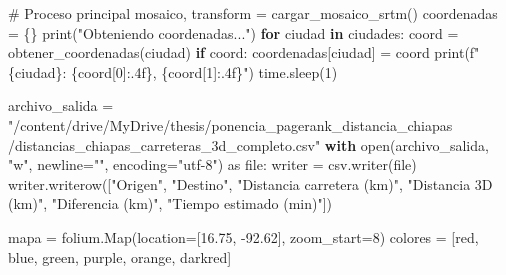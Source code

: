 \documentclass[
  letterpaper,
  DIV=11,
  numbers=noendperiod]{scrreprt}
\newenvironment{Shaded}{\begin{snugshade}}{\end{snugshade}}
\newcommand{\BuiltInTok}[1]{\textcolor[rgb]{0.00,0.23,0.31}{#1}}
\newcommand{\CommentTok}[1]{\textcolor[rgb]{0.37,0.37,0.37}{#1}}
\newcommand{\ControlFlowTok}[1]{\textcolor[rgb]{0.00,0.23,0.31}{\textbf{#1}}}
\newcommand{\DecValTok}[1]{\textcolor[rgb]{0.68,0.00,0.00}{#1}}
\newcommand{\ErrorTok}[1]{\textcolor[rgb]{0.68,0.00,0.00}{#1}}
\newcommand{\FloatTok}[1]{\textcolor[rgb]{0.68,0.00,0.00}{#1}}
\newcommand{\ImportTok}[1]{\textcolor[rgb]{0.00,0.46,0.62}{#1}}
\newcommand{\KeywordTok}[1]{\textcolor[rgb]{0.00,0.23,0.31}{\textbf{#1}}}
\newcommand{\NormalTok}[1]{\textcolor[rgb]{0.00,0.23,0.31}{#1}}
\newcommand{\OperatorTok}[1]{\textcolor[rgb]{0.37,0.37,0.37}{#1}}
\newcommand{\SpecialCharTok}[1]{\textcolor[rgb]{0.37,0.37,0.37}{#1}}
\newcommand{\SpecialStringTok}[1]{\textcolor[rgb]{0.13,0.47,0.30}{#1}}
\newcommand{\StringTok}[1]{\textcolor[rgb]{0.13,0.47,0.30}{#1}}
\begin{document}
\begin{Shaded}
\begin{Highlighting}[]
\CommentTok{\# Proceso principal}
\NormalTok{mosaico, transform }\OperatorTok{=}\NormalTok{ cargar\_mosaico\_srtm()}
\NormalTok{coordenadas }\OperatorTok{=}\NormalTok{ \{\}}
\BuiltInTok{print}\NormalTok{(}\StringTok{"Obteniendo coordenadas..."}\NormalTok{)}
\ControlFlowTok{for}\NormalTok{ ciudad }\KeywordTok{in}\NormalTok{ ciudades:}
\NormalTok{    coord }\OperatorTok{=}\NormalTok{ obtener\_coordenadas(ciudad)}
    \ControlFlowTok{if}\NormalTok{ coord:}
\NormalTok{        coordenadas[ciudad] }\OperatorTok{=}\NormalTok{ coord}
        \BuiltInTok{print}\NormalTok{(}\SpecialStringTok{f"}\SpecialCharTok{\{}\NormalTok{ciudad}\SpecialCharTok{\}}\SpecialStringTok{: }\SpecialCharTok{\{}\NormalTok{coord[}\DecValTok{0}\NormalTok{]}\SpecialCharTok{:.4f\}}\SpecialStringTok{, }\SpecialCharTok{\{}\NormalTok{coord[}\DecValTok{1}\NormalTok{]}\SpecialCharTok{:.4f\}}\SpecialStringTok{"}\NormalTok{)}
\NormalTok{    time.sleep(}\DecValTok{1}\NormalTok{)}

\NormalTok{archivo\_salida }\OperatorTok{=}
    \CommentTok{"/content/drive/MyDrive/thesis/ponencia\_pagerank\_distancia\_chiapas}
\ErrorTok{    /distancias\_chiapas\_carreteras\_3d\_completo.csv"}
\ControlFlowTok{with} \BuiltInTok{open}\NormalTok{(archivo\_salida, }\StringTok{"w"}\NormalTok{, newline}\OperatorTok{=}\StringTok{""}\NormalTok{, }
\NormalTok{    encoding}\OperatorTok{=}\StringTok{"utf{-}8"}\NormalTok{) }\ImportTok{as} \BuiltInTok{file}\NormalTok{:}
\NormalTok{    writer }\OperatorTok{=}\NormalTok{ csv.writer(}\BuiltInTok{file}\NormalTok{)}
\NormalTok{    writer.writerow([}\StringTok{"Origen"}\NormalTok{, }\StringTok{"Destino"}\NormalTok{, }\StringTok{"Distancia carretera (km)"}\NormalTok{, }
        \StringTok{"Distancia 3D (km)"}\NormalTok{, }\StringTok{"Diferencia (km)"}\NormalTok{, }\StringTok{"Tiempo estimado (min)"}\NormalTok{])}

\NormalTok{    mapa }\OperatorTok{=}\NormalTok{ folium.Map(location}\OperatorTok{=}\NormalTok{[}\FloatTok{16.75}\NormalTok{, }\OperatorTok{{-}}\FloatTok{92.62}\NormalTok{], zoom\_start}\OperatorTok{=}\DecValTok{8}\NormalTok{)}
\NormalTok{    colores }\OperatorTok{=}\NormalTok{ [}\StringTok{\textquotesingle{}red\textquotesingle{}}\NormalTok{, }\StringTok{\textquotesingle{}blue\textquotesingle{}}\NormalTok{, }\StringTok{\textquotesingle{}green\textquotesingle{}}\NormalTok{, }\StringTok{\textquotesingle{}purple\textquotesingle{}}\NormalTok{, }\StringTok{\textquotesingle{}orange\textquotesingle{}}\NormalTok{, }\StringTok{\textquotesingle{}darkred\textquotesingle{}}\NormalTok{]}


\end{Highlighting}
\end{Shaded}
\end{document}
